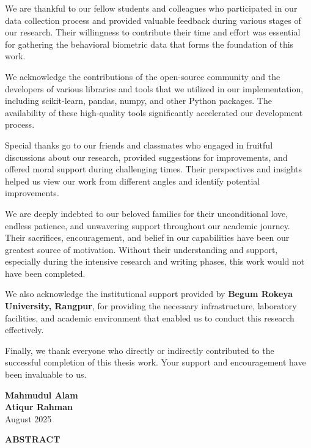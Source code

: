 \documentclass[
  12pt,
  a4paper,
]{report}
\begin{document}
We are thankful to our fellow students and colleagues who participated
in our data collection process and provided valuable feedback during
various stages of our research. Their willingness to contribute their
time and effort was essential for gathering the behavioral biometric
data that forms the foundation of this work.

We acknowledge the contributions of the open-source community and the
developers of various libraries and tools that we utilized in our
implementation, including scikit-learn, pandas, numpy, and other Python
packages. The availability of these high-quality tools significantly
accelerated our development process.

Special thanks go to our friends and classmates who engaged in fruitful
discussions about our research, provided suggestions for improvements,
and offered moral support during challenging times. Their perspectives
and insights helped us view our work from different angles and identify
potential improvements.

We are deeply indebted to our beloved families for their unconditional
love, endless patience, and unwavering support throughout our academic
journey. Their sacrifices, encouragement, and belief in our capabilities
have been our greatest source of motivation. Without their understanding
and support, especially during the intensive research and writing
phases, this work would not have been completed.

We also acknowledge the institutional support provided by
\textbf{Begum Rokeya University, Rangpur}, for providing the necessary
infrastructure, laboratory facilities, and academic environment that
enabled us to conduct this research effectively.

Finally, we thank everyone who directly or indirectly contributed to the
successful completion of this thesis work. Your support and
encouragement have been invaluable to us.

\vspace{2cm}

\begin{flushright}
\textbf{Mahmudul Alam}\\
\textbf{Atiqur Rahman}\\
August 2025
\end{flushright}

\newpage

\newpage
\thispagestyle{plain}

\begin{center}
\vspace\*{2cm}
\textbf{\Large ABSTRACT}
\end{center}
\end{document}
